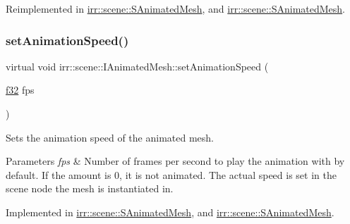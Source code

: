 Reimplemented in \hyperlink{structirr_1_1scene_1_1SAnimatedMesh_a423a3a9a7d2075eac53280fdfb15fdc9}{irr\+::scene\+::\+S\+Animated\+Mesh}, and \hyperlink{structirr_1_1scene_1_1SAnimatedMesh_a423a3a9a7d2075eac53280fdfb15fdc9}{irr\+::scene\+::\+S\+Animated\+Mesh}.

\mbox{\label{classirr_1_1scene_1_1IAnimatedMesh_a5eb1b09d96547dbd273d489e58d62658}} 
\subsubsection{\texorpdfstring{set\+Animation\+Speed()}{setAnimationSpeed()}\hspace{0.1cm}{\footnotesize\ttfamily [1/2]}}
{\footnotesize\ttfamily virtual void irr\+::scene\+::\+I\+Animated\+Mesh\+::set\+Animation\+Speed (\begin{DoxyParamCaption}\item[{\hyperlink{namespaceirr_a0277be98d67dc26ff93b1a6a1d086b07}{f32}}]{fps }\end{DoxyParamCaption})\hspace{0.3cm}{\ttfamily [pure virtual]}}



Sets the animation speed of the animated mesh. 


\begin{DoxyParams}{Parameters}
{\em fps} & Number of frames per second to play the animation with by default. If the amount is 0, it is not animated. The actual speed is set in the scene node the mesh is instantiated in. \\
\hline
\end{DoxyParams}


Implemented in \hyperlink{structirr_1_1scene_1_1SAnimatedMesh_ae7a32638fe5c59007d044bbc3c170108}{irr\+::scene\+::\+S\+Animated\+Mesh}, and \hyperlink{structirr_1_1scene_1_1SAnimatedMesh_ae7a32638fe5c59007d044bbc3c170108}{irr\+::scene\+::\+S\+Animated\+Mesh}.

\mbox{\label{classirr_1_1scene_1_1IAnimatedMesh_a5eb1b09d96547dbd273d489e58d62658}} 
